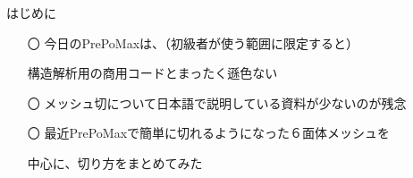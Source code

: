 \begin{frame}{はじめに}
  \begin{itemize}[itemsep=2.5ex, leftmargin=3mm]
      \large
      \item[〇] 今日のPrePoMaxは、（初級者が使う範囲に限定すると）

                構造解析用の商用コードとまったく遜色ない

      \item[〇] メッシュ切について日本語で説明している資料が少ないのが残念

      \item[〇] 最近PrePoMaxで簡単に切れるようになった６面体メッシュを

                中心に、切り方をまとめてみた
  \end{itemize}
\end{frame}
